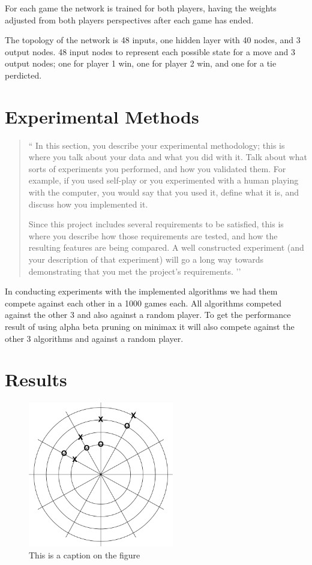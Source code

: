 \documentclass[12pt,letterpaper]{article}
\begin{document}
For each game the network is trained for both players, having the weights adjusted from both players perspectives after each game has ended.

The topology of the network is 48 inputs, one hidden layer with 40 nodes, and 3 output nodes. 48 input nodes to represent each possible state for a move and 3 output nodes; one for player 1 win, one for player 2 win, and one for a tie perdicted. 

\section{Experimental Methods}
\begin{quote}
`` 
In this section, you describe your experimental methodology; this is where you talk
about your data and what you did with it.  Talk about what sorts of experiments
you performed, and how you validated them.  For example, if you used self-play
or you experimented with a human playing with the computer, you would say that 
you used it, define what it is, and discuss how you implemented it.  

Since this project includes several requirements to be satisfied, this is where you describe
how those requirements are tested, and how the resulting features are being compared.
A well constructed experiment (and your description of that experiment) will go a long
way towards demonstrating that you met the project's requirements.
’’
\end{quote}

In conducting experiments with the implemented algorithms we had them compete against each other in a 1000 games each. All algorithms competed against the other 3 and also against a random player. To get the performance result of using alpha beta pruning on minimax it will also compete against the other 3 algorithms and against a random player. 



\section{Results}
\begin{figure}
\begin{center}
\includegraphics[width=2.5in]{P-TTT-ex.png}
\end{center}
\caption{This is a caption on the figure}
\label{somefigure}
\end{figure}
\end{document}
